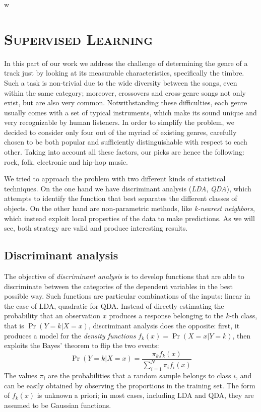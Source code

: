 w\documentclass[11pt, oneside]{article}
\begin{document}
\section[Supervised Learning]{\textsc{Supervised Learning}}
In this part of our work we address the challenge of determining the genre of a track just by looking at its measurable characteristics, specifically the timbre. Such a task is non-trivial due to the wide diversity between the songs, even within the same category; moreover, crossovers and cross-genre songs not only exist, but are also very common. Notwithstanding these difficulties, each genre usually comes with a set of typical instruments, which make its sound unique and very recognizable by human listeners. In order to simplify the problem, we decided to consider only four out of the myriad of existing genres, carefully chosen to be both popular and sufficiently distinguishable with respect to each other.
Taking into account all these factors, our picks are hence the following: rock, folk, electronic and hip-hop music.

We tried to approach the problem with two different kinds of statistical techniques. On the one hand we have discriminant analysis (\emph{LDA}, \emph{QDA}), which attempts to identify the function that best separates the different classes of objects. On the other hand are non-parametric methods, like \emph{k-nearest neighbors}, which instead exploit local properties of the data to make predictions. As we will see, both strategy are valid and produce interesting results. 

\subsection{Discriminant analysis}

The objective of \emph{discriminant analysis} is to develop functions that are able to discriminate between the categories of the dependent variables in the best possible way. Such functions are particular combinations of the inputs: linear in the case of LDA, quadratic for QDA.
Instead of directly estimating the probability that an observation $x$ produces a response belonging to the $k$-th class, that is $\Pr(Y=k|X=x)$, discriminant analysis does the opposite: first, it produces a model for the \emph{density functions} $f_k(x) = \Pr(X=x | Y=k)$, then exploits the Bayes' theorem to flip the two events:
\begin{equation*}
    \Pr(Y=k|X=x) = \frac{\pi_k f_k(x)}{\sum_{i=1}^N \pi_i f_i(x)}
\end{equation*}
The values $\pi_i$ are the probabilities that a random sample belongs to class $i$, and can be easily obtained by observing the proportions in the training set. The form of $f_k(x)$ is unknown a priori; in most cases, including LDA and QDA, they are assumed to be Gaussian functions.\\
\end{document}
